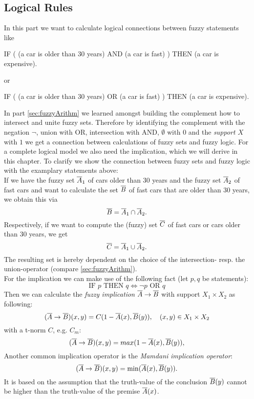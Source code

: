 \subsection{Logical Rules} \label{sec:logicRules}
In this part we want to calculate logical connections between fuzzy statements like
\begin{center}
IF ( (a car is older than 30 years) AND (a car is fast) ) THEN (a car is expensive).
\end{center}
or
\begin{center}
IF ( (a car is older than 30 years) OR (a car is fast) ) THEN (a car is expensive).
\end{center}
In part \ref{sec:fuzzyArithm} we learned amongst building the complement how to intersect and unite fuzzy sets. Therefore by identifying the complement with the negation $\neg$, union with OR, intersection with AND, $\emptyset$ with $0$ and the \emph{support $X$} with $1$ we get a connection between calculations of fuzzy sets and fuzzy logic. For a complete logical model we also need the implication, which we will derive in this chapter. To clarify we show the connection between fuzzy sets and fuzzy logic with the examplary statements above: \\
If we have the fuzzy set $\overline{A}_1$ of cars older than 30 years and the fuzzy set $\overline{A}_2$ of fast cars and want to calculate the set $\overline{B}$ of fast cars that are older than 30 years, we obtain this via
\[ \overline{B} = \overline{A}_1\cap\overline{A}_2. \]
Respectively, if we want to compute the (fuzzy) set $\overline{C}$ of fast cars or cars older than 30 years, we get
\[ \overline{C} = \overline{A}_1\cup\overline{A}_2. \]
The resulting set is hereby dependent on the choice of the intersection- resp. the union-operator (compare \ref{sec:fuzzyArithm}).\\
For the implication we can make use of the following fact (let $p,q$ be statements):
\[ \text{IF } p \text{ THEN } q \Leftrightarrow \neg p \text{ OR } q \]
Then we can calculate the \emph{fuzzy implication} $\overline{A}\rightarrow\overline{B}$ with support $X_1\times X_2$ as following:
\[ (\overline{A}\rightarrow\overline{B})(x,y) = C(1-\overline{A}(x), \overline{B}(y)), \quad (x,y)\in X_1\times X_2 \]
with a t-norm $C$, e.g. $C_m$:
\[ (\overline{A}\rightarrow\overline{B})(x,y) = max(1-\overline{A}(x), \overline{B}(y)), \]
Another common implication operator is the \emph{Mamdani implication operator}:
\[ (\overline{A}\rightarrow\overline{B})(x,y) = \min(\overline{A}(x), \overline{B}(y)).\]
It is based on the assumption that the truth-value of the conclusion $\overline{B}(y)$ cannot be higher than the truth-value of the premise $\overline{A}(x)$.


